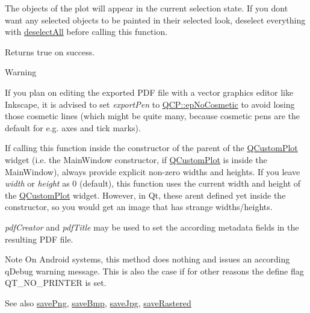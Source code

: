 The objects of the plot will appear in the current selection state. If you don\textquotesingle{}t want any selected objects to be painted in their selected look, deselect everything with \hyperlink{class_q_custom_plot_a9d4808ab925b003054085246c92a257c}{deselect\+All} before calling this function.

Returns true on success.

\begin{DoxyWarning}{Warning}
\begin{DoxyItemize}
\item If you plan on editing the exported P\+DF file with a vector graphics editor like Inkscape, it is advised to set {\itshape export\+Pen} to \hyperlink{namespace_q_c_p_a17844f19e1019693a953e1eb93536d2faec51f17ee42178094138e69ac73daa52}{Q\+C\+P\+::ep\+No\+Cosmetic} to avoid losing those cosmetic lines (which might be quite many, because cosmetic pens are the default for e.\+g. axes and tick marks). \item If calling this function inside the constructor of the parent of the \hyperlink{class_q_custom_plot}{Q\+Custom\+Plot} widget (i.\+e. the Main\+Window constructor, if \hyperlink{class_q_custom_plot}{Q\+Custom\+Plot} is inside the Main\+Window), always provide explicit non-\/zero widths and heights. If you leave {\itshape width} or {\itshape height} as 0 (default), this function uses the current width and height of the \hyperlink{class_q_custom_plot}{Q\+Custom\+Plot} widget. However, in Qt, these aren\textquotesingle{}t defined yet inside the constructor, so you would get an image that has strange widths/heights.\end{DoxyItemize}
{\itshape pdf\+Creator} and {\itshape pdf\+Title} may be used to set the according metadata fields in the resulting P\+DF file.
\end{DoxyWarning}
\begin{DoxyNote}{Note}
On Android systems, this method does nothing and issues an according q\+Debug warning message. This is also the case if for other reasons the define flag {\ttfamily Q\+T\+\_\+\+N\+O\+\_\+\+P\+R\+I\+N\+T\+ER} is set.
\end{DoxyNote}
\begin{DoxySeeAlso}{See also}
\hyperlink{class_q_custom_plot_ac92cc9256d12f354b40a4be4600b5fb9}{save\+Png}, \hyperlink{class_q_custom_plot_ae3a86ed0795670e50afa21759d4fa13d}{save\+Bmp}, \hyperlink{class_q_custom_plot_a76f0d278e630a711fa6f48048cfd83e4}{save\+Jpg}, \hyperlink{class_q_custom_plot_ad7723ce2edfa270632ef42b03a444352}{save\+Rastered} 
\end{DoxySeeAlso}
